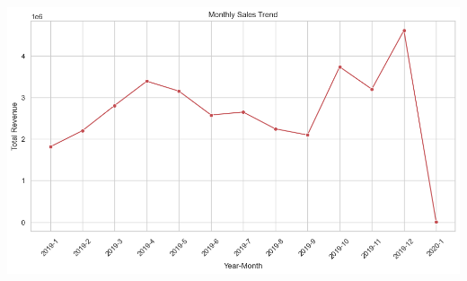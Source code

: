 \documentclass[
  letterpaper,
  DIV=11,
  numbers=noendperiod]{scrartcl}
\begin{document}
\includegraphics{Projet_Spark_GIRONDIN_Audric_files/figure-pdf/cell-22-output-1.png}
\end{document}
